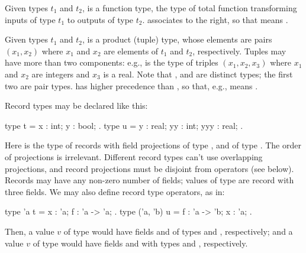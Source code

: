 Given types $t_1$ and $t_2$,  is a function type,
the type of total function transforming inputs of type $t_1$ to
outputs of type $t_2$. \ec{->} associates to the right, so that
 means .

Given types $t_1$ and $t_2$,  is a product (tuple)
type, whose elements are pairs $(x_1, x_2)$ where $x_1$ and $x_2$ are
elements of $t_1$ and $t_2$, respectively. Tuples may have more than
two components: e.g.,  is the type of triples
$(x_1, x_2, x_3)$ where $x_1$ and $x_2$ are integers and $x_3$ is a real.
Note that ,  and
 are distinct types; the first two are pair types.
\ec{*} has higher precedence than \ec{->}, so that, e.g.,
 means .

Record types may be declared like this:
\begin{easycrypt}{}{}
type t = { x : int; y : bool; }.
type u = { y : real; yy : int; yyy : real; }.
\end{easycrypt}
Here  is the type of records with field projections  of
type , and  of type . The order of projections
is irrelevant.  Different record types can't use overlapping
projections, and record projections must be disjoint from operators
(see below). Records may have any non-zero number of fields; values of
type  are record with three fields. We may also define record
type operators, as in:
\begin{easycrypt}{}{}
type 'a t = { x : 'a; f : 'a -> 'a; }.
type ('a, 'b) u = { f : 'a -> 'b; x : 'a; }.
\end{easycrypt}
Then, a value $v$ of type  would have fields  and
 of types  and , respectively; and
a value $v$ of type  would have fields  and
 with types  and , respectively.


